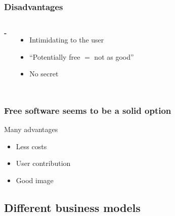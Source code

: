 \documentclass{beamer}
\begin{document}
\begin{frame}

  \frametitle{Disadvantages}

  \begin{columns}

    \begin{center}
      \Huge{\textbf{-}}
    \end{center}

    \begin{itemize}
      \item<2->{Intimidating to the user}
      \item<3->{``Potentially free $=$ not as good''}
      \item<4>{No secret}
    \end{itemize}

  \end{columns}

\end{frame}

\begin{frame}

  \frametitle{Free software seems to be a solid option}

  \begin{block}{Many advantages}
    \begin{itemize}
    \item{Less costs}
    \item{User contribution}
    \item{Good image}
    \end{itemize}
  \end{block}

  \vfill


\end{frame}

\subsection{Different business models}
\end{document}
